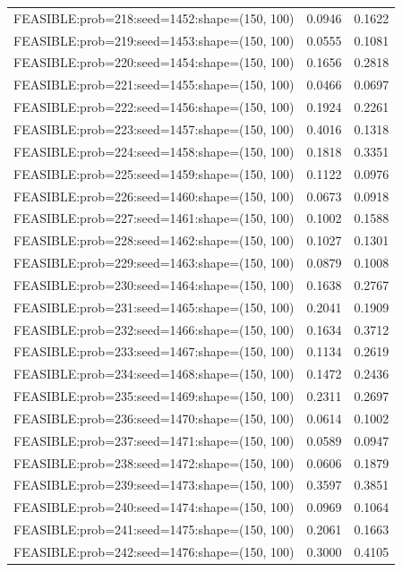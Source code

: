 \begin{longtable}{lcc}
FEASIBLE:prob=218:seed=1452:shape=(150, 100) &   0.0946 & 0.1622 \\
FEASIBLE:prob=219:seed=1453:shape=(150, 100) &   0.0555 & 0.1081 \\
FEASIBLE:prob=220:seed=1454:shape=(150, 100) &   0.1656 & 0.2818 \\
FEASIBLE:prob=221:seed=1455:shape=(150, 100) &   0.0466 & 0.0697 \\
FEASIBLE:prob=222:seed=1456:shape=(150, 100) &   0.1924 & 0.2261 \\
FEASIBLE:prob=223:seed=1457:shape=(150, 100) &   0.4016 & 0.1318 \\
FEASIBLE:prob=224:seed=1458:shape=(150, 100) &   0.1818 & 0.3351 \\
FEASIBLE:prob=225:seed=1459:shape=(150, 100) &   0.1122 & 0.0976 \\
FEASIBLE:prob=226:seed=1460:shape=(150, 100) &   0.0673 & 0.0918 \\
FEASIBLE:prob=227:seed=1461:shape=(150, 100) &   0.1002 & 0.1588 \\
FEASIBLE:prob=228:seed=1462:shape=(150, 100) &   0.1027 & 0.1301 \\
FEASIBLE:prob=229:seed=1463:shape=(150, 100) &   0.0879 & 0.1008 \\
FEASIBLE:prob=230:seed=1464:shape=(150, 100) &   0.1638 & 0.2767 \\
FEASIBLE:prob=231:seed=1465:shape=(150, 100) &   0.2041 & 0.1909 \\
FEASIBLE:prob=232:seed=1466:shape=(150, 100) &   0.1634 & 0.3712 \\
FEASIBLE:prob=233:seed=1467:shape=(150, 100) &   0.1134 & 0.2619 \\
FEASIBLE:prob=234:seed=1468:shape=(150, 100) &   0.1472 & 0.2436 \\
FEASIBLE:prob=235:seed=1469:shape=(150, 100) &   0.2311 & 0.2697 \\
FEASIBLE:prob=236:seed=1470:shape=(150, 100) &   0.0614 & 0.1002 \\
FEASIBLE:prob=237:seed=1471:shape=(150, 100) &   0.0589 & 0.0947 \\
FEASIBLE:prob=238:seed=1472:shape=(150, 100) &   0.0606 & 0.1879 \\
FEASIBLE:prob=239:seed=1473:shape=(150, 100) &   0.3597 & 0.3851 \\
FEASIBLE:prob=240:seed=1474:shape=(150, 100) &   0.0969 & 0.1064 \\
FEASIBLE:prob=241:seed=1475:shape=(150, 100) &   0.2061 & 0.1663 \\
FEASIBLE:prob=242:seed=1476:shape=(150, 100) &   0.3000 & 0.4105 \\

\end{longtable}
